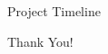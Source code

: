 \documentclass{beamer}
\begin{document}
\begin{frame}{Project Timeline}
    
\end{frame}


\begin{frame}
    \LARGE{Thank You!}
\end{frame}
\end{document}
